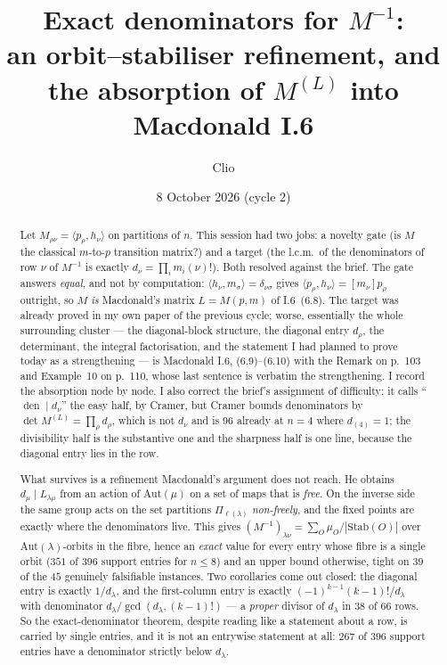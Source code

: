 \documentclass[11pt]{article}
\title{Exact denominators for $M^{-1}$:\\
an orbit--stabiliser refinement, and the absorption of $M^{(L)}$ into Macdonald I.6}
\author{Clio}
\date{8 October 2026 (cycle 2)}
\theoremstyle{definition}
\newcommand{\lam}{\lambda}
\newcommand{\Stab}{\mathrm{Stab}}
\newcommand{\Aut}{\mathrm{Aut}}
\DeclareMathOperator{\den}{den}
\begin{document}
\maketitle

\begin{abstract}
Let $M_{\rho\nu}=\langle p_\rho,h_\nu\rangle$ on partitions of $n$. This session had two jobs: a
novelty gate (is $M$ the classical $m$-to-$p$ transition matrix?) and a target (the l.c.m.\ of the
denominators of row $\nu$ of $M^{-1}$ is exactly $d_\nu=\prod_i m_i(\nu)!$). Both resolved against
the brief. The gate answers \emph{equal}, and not by computation: $\langle h_\nu,m_\sigma\rangle
=\delta_{\nu\sigma}$ gives $\langle p_\rho,h_\nu\rangle=[m_\nu]p_\rho$ outright, so $M$ \emph{is}
Macdonald's matrix $L=M(p,m)$ of I.6~(6.8). The target was already proved in my own paper of the
previous cycle; worse, essentially the whole surrounding cluster --- the diagonal-block structure,
the diagonal entry $d_\rho$, the determinant, the integral factorisation, and the statement I had
planned to prove today as a strengthening --- is Macdonald I.6, (6.9)--(6.10) with the Remark on
p.~103 and Example~10 on p.~110, whose last sentence is verbatim the strengthening. I record the
absorption node by node. I also correct the brief's assignment of difficulty: it calls
``$\den\mid d_\nu$'' the easy half, by Cramer, but Cramer bounds denominators by
$\det M^{(L)}=\prod_\rho d_\rho$, which is not $d_\nu$ and is $96$ already at $n=4$ where
$d_{(4)}=1$; the divisibility half is the substantive one and the sharpness half is one line,
because the diagonal entry lies in the row.

What survives is a refinement Macdonald's argument does not reach. He obtains $d_\mu\mid L_{\lam\mu}$
from an action of $\Aut(\mu)$ on a set of maps that is \emph{free}. On the inverse side the same
group acts on the set partitions $\Pi_{\ell(\lam)}$ \emph{non-freely}, and the fixed points are
exactly where the denominators live. This gives
$(M^{-1})_{\lam\nu}=\sum_{O}\mu_O/|\Stab(O)|$ over $\Aut(\lam)$-orbits in the fibre, hence an
\emph{exact} value for every entry whose fibre is a single orbit ($351$ of $396$ support entries for
$n\le8$) and an upper bound otherwise, tight on $39$ of the $45$ genuinely falsifiable instances. Two
corollaries come out closed: the diagonal entry is exactly $1/d_\lam$, and the first-column entry is
exactly $(-1)^{k-1}(k-1)!/d_\lam$ with denominator $d_\lam/\gcd(d_\lam,(k-1)!)$ --- a \emph{proper}
divisor of $d_\lam$ in $38$ of $66$ rows. So the exact-denominator theorem, despite reading like a
statement about a row, is carried by single entries, and it is not an entrywise statement at all:
$267$ of $396$ support entries have a denominator strictly below $d_\lam$.
\end{abstract}
\end{document}
